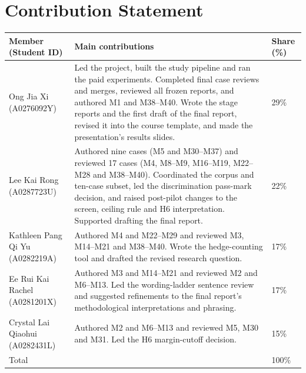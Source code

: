 \documentclass[11pt]{article}
\begin{document}
\clearpage
\section*{Contribution Statement}
\begin{table}[H]
\small\renewcommand{\arraystretch}{1.25}
\begin{tabularx}{\textwidth}{@{}P{3.4cm} L P{1.4cm}@{}}
\toprule
Member (Student ID) & Main contributions & Share (\%)\\
\midrule
Ong Jia Xi\newline
(A0276092Y) & Led the project, built the study pipeline and ran the paid experiments. Completed final case reviews and merges, reviewed all frozen reports, and authored M1 and M38--M40. Wrote the stage reports and the first draft of the final report, revised it into the course template, and made the presentation's results slides. & 29\%\\
Lee Kai Rong\newline
(A0287723U) & Authored nine cases (M5 and M30--M37) and reviewed 17 cases (M4, M8--M9, M16--M19, M22--M28 and M38--M40). Coordinated the corpus and ten-case subset, led the discrimination pass-mark decision, and raised post-pilot changes to the screen, ceiling rule and H6 interpretation. Supported drafting the final report. & 22\%\\
Kathleen Pang Qi Yu\newline
(A0282219A) & Authored M4 and M22--M29 and reviewed M3, M14--M21 and M38--M40. Wrote the hedge-counting tool and drafted the revised research question. & 17\%\\
Ee Rui Kai Rachel\newline
(A0281201X) & Authored M3 and M14--M21 and reviewed M2 and M6--M13. Led the wording-ladder sentence review and suggested refinements to the final report’s methodological interpretations and phrasing. & 17\%\\
Crystal Lai Qiaohui\newline
(A0282431L) & Authored M2 and M6--M13 and reviewed M5, M30 and M31. Led the H6 margin-cutoff decision. & 15\%\\
\midrule
Total & & 100\%\\
\bottomrule
\end{tabularx}
\end{table}
\clearpage


\clearpage
\appendix
\setlength{\parskip}{2pt plus 1pt}

\end{document}
